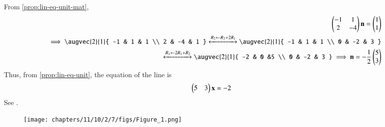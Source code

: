 		From \eqref{prop:lin-eq-unit-mat},
\begin{align}
	\myvec{ -1 & 1\\  2 & -4 }\vec{n} = \myvec{1 \\ 1 }
	\\
	\implies 
	\augvec{2}{1}{ 
	-1 & 1 & 1
	\\  
	2 & -4 & 1
	}
     \xleftrightarrow[]{R_2 \leftarrow R_2+2R_1}
	\augvec{2}{1}{ 
	-1 & 1 & 1
	\\ 
	0 & -2 & 3 
	}
	\\
     \xleftrightarrow[]{R_1 \leftarrow 2R_1+R_2}
	\augvec{2}{1}{ 
	-2 & 0 &5 
	\\ 
	0 & -2 & 3 
	}
	\implies \vec{n} = -\frac{1}{2}\myvec{ 5 \\ 3}
\end{align}
Thus, from
		\eqref{prop:lin-eq-unit},
the equation of the line is
\begin{align}
 \begin{pmatrix} 5 & 3\end{pmatrix}\mathbf{x}  &= -2
\end{align}
See 
   .
\begin{figure}[H]
  \centering
   \texttt{[image: chapters/11/10/2/7/figs/Figure\_1.png]}
   \caption{}
   \label{fig:chapters/11/10/2/7/Line_AB}
\end{figure}




